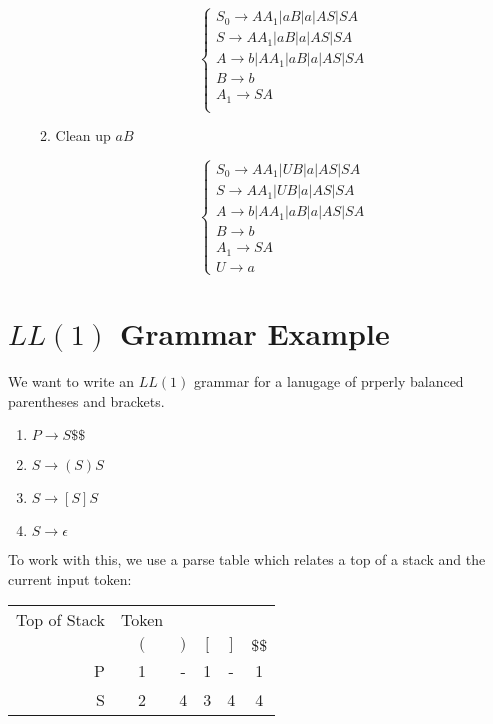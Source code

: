 \documentclass{article}
\begin{document}
\begin{enumerate}[label=(Step \arabic*)]
\begin{enumerate}[label=(\alph*)]
    \[\begin{cases}
    S_0 \rightarrow AA_1|aB|a|AS|SA \\
    S\rightarrow AA_1|aB|a|AS|SA \\
    A\rightarrow b|AA_1|aB|a|AS|SA \\
    B\rightarrow b \\
    A_1\rightarrow SA \\
    \end{cases}\]

  \item Clean up $aB$

    \[\begin{cases}
    S_0 \rightarrow AA_1|UB|a|AS|SA \\
    S\rightarrow AA_1|UB|a|AS|SA \\
    A\rightarrow b|AA_1|aB|a|AS|SA \\
    B\rightarrow b \\
    A_1\rightarrow SA \\
    U\rightarrow a
    \end{cases}\]

  \end{enumerate}
\end{enumerate}

\section*{$LL(1)$ Grammar Example}

We want to write an $LL(1)$ grammar for a lanugage of prperly balanced
parentheses and brackets.

\begin{enumerate}[label=\arabic*)]
\item $P\rightarrow{}S\$\$$
\item $S\rightarrow (S)S$
\item $S\rightarrow [S]S$
\item $S\rightarrow\epsilon$
\end{enumerate}

To work with this, we use a parse table which relates a top of a stack
and the current input token:

\begin{tabular}{r|ccccc}
Top of Stack & Token & & & \\
 & $($ & $)$ & $[$ & $]$ & $\$\$$ \\
\hline
P & 1 & - & 1 & - & 1 \\
S & 2 & 4 & 3 & 4 & 4 \\
\end{tabular}
\end{document}
